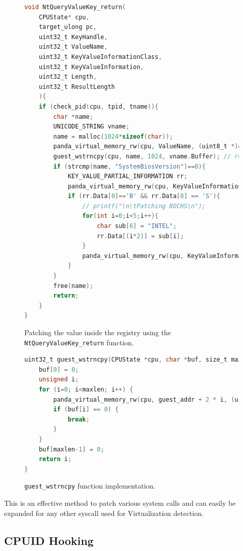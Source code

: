 \begin{figure}[htp]
\centering
\begin{lstlisting}[language=C]
void NtQueryValueKey_return(
    CPUState* cpu,
    target_ulong pc,
    uint32_t KeyHandle,
    uint32_t ValueName, 
    uint32_t KeyValueInformationClass,
    uint32_t KeyValueInformation,
    uint32_t Length, 
    uint32_t ResultLength 
    ){ 
    if (check_pid(cpu, tpid, tname)){
        char *name;
        UNICODE_STRING vname;
        name = malloc(1024*sizeof(char));
        panda_virtual_memory_rw(cpu, ValueName, (uint8_t *)&vname, sizeof(UNICODE_STRING), 0); // extract the pointer to string
        guest_wstrncpy(cpu, name, 1024, vname.Buffer); // read the string
        if (strcmp(name, "SystemBiosVersion")==0){
            KEY_VALUE_PARTIAL_INFORMATION rr;
            panda_virtual_memory_rw(cpu, KeyValueInformation, (uint8_t *)&rr, Length, 0);
            if (rr.Data[0]=='B' && rr.Data[8] == 'S'){
                // printf("\n\tPatching BOCHS\n");
                for(int i=0;i<5;i++){
                    char sub[6] = "INTEL";
                    rr.Data[(i*2)] = sub[i];
                }
                panda_virtual_memory_rw(cpu, KeyValueInformation, (uint8_t *)&rr, Length, 1);    
            }
        }
        free(name);
        return;
    }
}
\end{lstlisting}
\caption{Patching the value inside the registry using the \lstinline{NtQueryValueKey_return} function.}
\label{fig:pfun}
\end{figure} 

\begin{figure}[htp]
\centering
\begin{lstlisting}[language=C] 
uint32_t guest_wstrncpy(CPUState *cpu, char *buf, size_t maxlen, target_ulong guest_addr) {
    buf[0] = 0;
    unsigned i;
    for (i=0; i<maxlen; i++) {
        panda_virtual_memory_rw(cpu, guest_addr + 2 * i, (uint8_t *)&buf[i], 1, 0);
        if (buf[i] == 0) {
            break;
        }
    }
    buf[maxlen-1] = 0;
    return i;
}
\end{lstlisting}
\caption{\lstinline{guest_wstrncpy} function implementation.}
\label{fig:gstrin}
\end{figure}

This is an effective method to patch various system calls and can easily be expanded for any other syscall used for Virtualization detection.


\subsection{CPUID Hooking}

